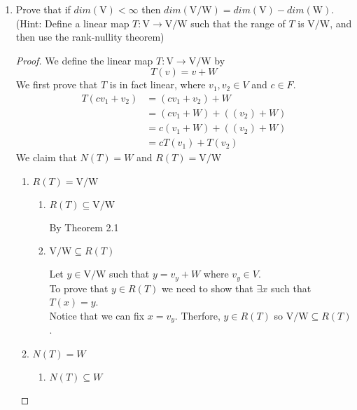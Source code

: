 \documentclass[11pt]{scrartcl}
\begin{document}
\begin{enumerate}[label=\alph*.]
	\item{
	      Prove that if $dim(\mathrm{V}) < \infty$ then $dim(\mathrm{V}/\mathrm{W}) = dim(\mathrm{V}) - dim(\mathrm{W})$.
	      (Hint: Define a linear map $T:\mathrm{V} \rightarrow \mathrm{V}/\mathrm{W}$ such that the range of $T$ is $\mathrm{V}/\mathrm{W}$, and then use the rank-nullity theorem)
	      \begin{proof}We define the linear map $T:\mathrm{V} \rightarrow \mathrm{V}/\mathrm{W}$ by \[T(v) = v + W\]
		      We first prove that $T$ is in fact linear, where $v_1,v_2 \in V$ and $c \in F$.
		      \begin{align*}
			      T(cv_1 + v_2) & = (cv_1 + v_2) + W         \\
			                    & =  (cv_1 + W)+ ((v_2) + W) \\
			                    & =  c(v_1 + W)+ ((v_2) + W) \\
			                    & =  cT(v_1)+ T(v_2)
		      \end{align*}
		      We claim that $N(T) = W$ and $R(T) = \mathrm{V}/\mathrm{W}$
		      \begin{enumerate}[label=\arabic*.]
			      \item{
			            $R(T) = \mathrm{V}/\mathrm{W}$
			            \begin{enumerate}[label=\roman*.]
				            \item{
				                  $R(T) \subseteq \mathrm{V}/\mathrm{W}$\par
				                  By Theorem 2.1
				                  }
				            \item{
				                  $\mathrm{V}/\mathrm{W} \subseteq R(T)$\par
				                  Let $y \in \mathrm{V}/\mathrm{W}$ such that $y = v_y + W$ where $v_y \in V$.\\
				                  To prove that $y \in R(T)$ we need to show that  $\exists x$ such that $ T(x) = y$.\\
				                  Notice that we can fix $x = v_y$. Therfore, $y \in R(T)$ so $\mathrm{V}/\mathrm{W} \subseteq R(T)$.
				                  }
			            \end{enumerate}
			            }
			      \item{
			            $N(T) = W$
			            \begin{enumerate}[label=\roman*.]
				            \item{
				                  $N(T) \subseteq W$
				                  \begin{lemma}

\end{lemma}}
\end{enumerate}}
\end{enumerate}
\end{proof}}
\end{enumerate}
\end{document}
